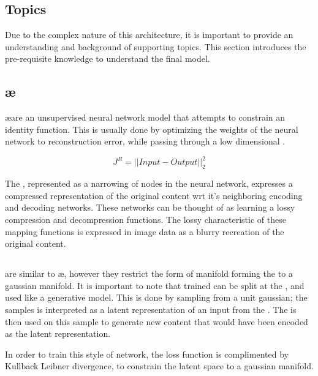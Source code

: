 \documentclass{article}
\begin{document}
\begin{multicols}{2}

\section{Topics}

Due to the complex nature of this architecture, it is important to provide an
understanding and background of supporting topics. This section introduces the
pre-requisite knowledge to understand the final model.

\subsection{\ae}
\ae are an unsupervised neural network model that attempts to constrain an
identity function. This is usually done by optimizing the weights of the neural
network to reconstruction error, while passing through a low dimensional \bottle.

\[J^{R}=||Input - Output||^2_2\]

The \bottle, represented as a narrowing of nodes in the neural network, expresses
a compressed representation of the original content wrt it's neighboring encoding and
decoding networks. These networks can be thought of as learning a lossy compression
and decompression functions. The lossy characteristic of these mapping functions is
expressed in image data as a blurry recreation of the original content.

\resizebox{.8\columnwidth}{!}{}
\pagebreak



\subsection{\vae}

\vae are similar to \ae, however they restrict the form of manifold forming the
\bottle to a gaussian manifold. It is important to note that trained \vae
can be split at the \bottle, and used like a generative model. This is
done by sampling from a unit gaussian; the samples is interpreted as a latent
representation of an input from the \encoder. The \decoder is then used on this sample
to generate new content that would have been encoded as the latent representation.

In order to train this style of network, the loss function is complimented by
Kullback Leibner divergence, to constrain the latent space to a gaussian manifold.


\end{multicols}
\end{document}
